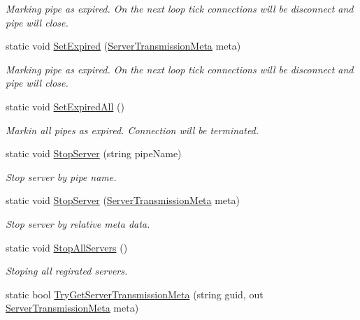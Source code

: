 \begin{DoxyCompactItemize}
\begin{DoxyCompactList}\small\item\em Marking pipe as expired. On the next loop tick connections will be disconnect and pipe will close. \end{DoxyCompactList}\item 
static void \mbox{\hyperlink{class_pipes_provider_1_1_a_p_i_a9bfed3a9b5733c6a76235ec096c903e3}{Set\+Expired}} (\mbox{\hyperlink{class_pipes_provider_1_1_server_transmission_meta}{Server\+Transmission\+Meta}} meta)
\begin{DoxyCompactList}\small\item\em Marking pipe as expired. On the next loop tick connections will be disconnect and pipe will close. \end{DoxyCompactList}\item 
static void \mbox{\hyperlink{class_pipes_provider_1_1_a_p_i_a7e26cdf7c5b1f43abd155b4988f7bab1}{Set\+Expired\+All}} ()
\begin{DoxyCompactList}\small\item\em Markin all pipes as expired. Connection will be terminated. \end{DoxyCompactList}\item 
static void \mbox{\hyperlink{class_pipes_provider_1_1_a_p_i_a1a81c47121d56bca83bd3cbf058d6478}{Stop\+Server}} (string pipe\+Name)
\begin{DoxyCompactList}\small\item\em Stop server by pipe name. \end{DoxyCompactList}\item 
static void \mbox{\hyperlink{class_pipes_provider_1_1_a_p_i_aec56e2367941c5cbf6501298a946b41a}{Stop\+Server}} (\mbox{\hyperlink{class_pipes_provider_1_1_server_transmission_meta}{Server\+Transmission\+Meta}} meta)
\begin{DoxyCompactList}\small\item\em Stop server by relative meta data. \end{DoxyCompactList}\item 
static void \mbox{\hyperlink{class_pipes_provider_1_1_a_p_i_a5ec1b30c068984a8dbff3a5a4d41a8b7}{Stop\+All\+Servers}} ()
\begin{DoxyCompactList}\small\item\em Stoping all regirated servers. \end{DoxyCompactList}\item 
static bool \mbox{\hyperlink{class_pipes_provider_1_1_a_p_i_a5eb987a8a4edfb2b26d861071aca70a2}{Try\+Get\+Server\+Transmission\+Meta}} (string guid, out \mbox{\hyperlink{class_pipes_provider_1_1_server_transmission_meta}{Server\+Transmission\+Meta}} meta)

\end{DoxyCompactItemize}
